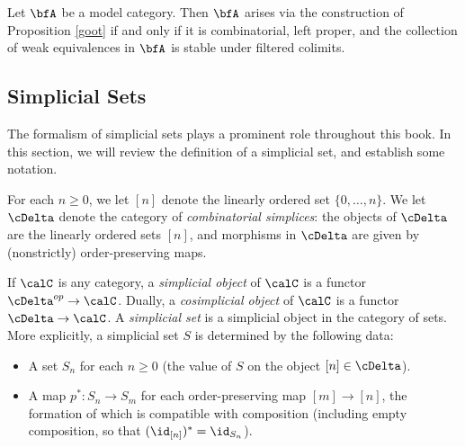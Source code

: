 



\begin{remark} 
Let $\bfA$ be a model category. Then $\bfA$ arises via the construction of Proposition \ref{goot} if and only if it is combinatorial, left proper, and the collection of weak equivalences in $\bfA$ is stable under filtered colimits. 
\end{remark}

\subsection{Simplicial Sets}\label{simpset}

The formalism of simplicial sets plays a prominent role throughout this book. In this section, we will review the definition of a simplicial set, and establish some notation.

For each $n \geq 0$, we let
$[n]$ denote the linearly ordered set $\{ 0, \ldots, n \}$.
We let $\cDelta$ denote
the category of {\it combinatorial simplices}: the objects of
$\cDelta$ are the linearly ordered sets $[n]$, and morphisms
in $\cDelta$ are given by (nonstrictly) order-preserving maps.

If $\calC$ is any category, a {\it simplicial object} of $\calC$
is a functor $\cDelta^{op} \rightarrow \calC$. Dually, a {\it
cosimplicial object} of $\calC$ is a functor $\cDelta \rightarrow
\calC$. A {\it simplicial set} is a simplicial object in the
category of sets. More explicitly, a simplicial set $S$ is
determined by the following data:

\begin{itemize}
\item A set $S_{n}$ for each $n \geq 0$ (the value of $S$
on the object $[n] \in \cDelta$).

\item A map $p^{\ast}: S_n \rightarrow S_m$ for each
order-preserving map $[m] \rightarrow [n]$, the formation of which is compatible with composition
(including empty composition, so that
$( \id_{[n]} )^{\ast} = \id_{S_n}$).
\end{itemize}

